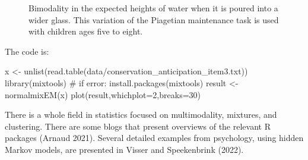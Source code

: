 \documentclass[
  a4paper,
  DIV=11,
  numbers=noendperiod,
  oneside]{scrreprt}
\newenvironment{Shaded}{}{}
\newcommand{\AttributeTok}[1]{\textcolor[rgb]{0.84,0.23,0.29}{#1}}
\newcommand{\CommentTok}[1]{\textcolor[rgb]{0.42,0.45,0.49}{#1}}
\newcommand{\DecValTok}[1]{\textcolor[rgb]{0.00,0.36,0.77}{#1}}
\newcommand{\FunctionTok}[1]{\textcolor[rgb]{0.44,0.26,0.76}{#1}}
\newcommand{\NormalTok}[1]{\textcolor[rgb]{0.14,0.16,0.18}{#1}}
\newcommand{\OtherTok}[1]{\textcolor[rgb]{0.44,0.26,0.76}{#1}}
\newcommand{\StringTok}[1]{\textcolor[rgb]{0.01,0.18,0.38}{#1}}
\begin{document}
\begin{figure}


\caption{\label{fig-ch3-img20-old-32}Bimodality in the expected heights
of water when it is poured into a wider glass. This variation of the
Piagetian maintenance task is used with children ages five to eight.}

\end{figure}%

The code is:

\begin{Shaded}
\begin{Highlighting}[]
\NormalTok{x }\OtherTok{\textless{}{-}} \FunctionTok{unlist}\NormalTok{(}\FunctionTok{read.table}\NormalTok{(}\StringTok{\textquotesingle{}data/conservation\_anticipation\_item3.txt\textquotesingle{}}\NormalTok{))}
\FunctionTok{library}\NormalTok{(mixtools) }\CommentTok{\# if error: install.packages(\textquotesingle{}mixtools\textquotesingle{})}
\NormalTok{result }\OtherTok{\textless{}{-}} \FunctionTok{normalmixEM}\NormalTok{(x)}
\FunctionTok{plot}\NormalTok{(result,}\AttributeTok{whichplot=}\DecValTok{2}\NormalTok{,}\AttributeTok{breaks=}\DecValTok{30}\NormalTok{)}
\end{Highlighting}
\end{Shaded}

There is a whole field in statistics focused on multimodality, mixtures,
and clustering. There are some blogs that present overviews of the
relevant R packages (Arnaud 2021). Several detailed examples from
psychology, using hidden Markov models, are presented in Visser and
Speekenbrink (2022).
\end{document}

